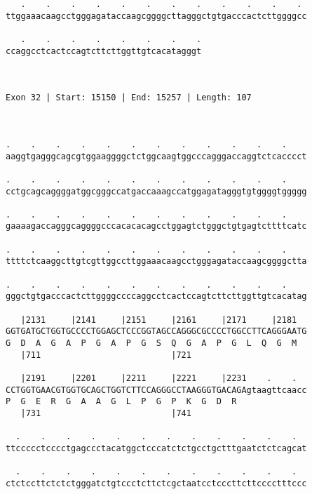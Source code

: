 \documentclass{article}
\begin{document}
\begin{Verbatim}
   .    .    .    .    .    .    .    .    .    .    .    . 
ttggaaacaagcctgggagataccaagcggggcttagggctgtgacccactcttggggcc
                                                            
   .    .    .    .    .    .    .    .
ccaggcctcactccagtcttcttggttgtcacatagggt
                                       
                                       
 
Exon 32 | Start: 15150 | End: 15257 | Length: 107



.    .    .    .    .    .    .    .    .    .    .    .    
aaggtgagggcagcgtggaaggggctctggcaagtggcccagggaccaggtctcacccct
                                                            
.    .    .    .    .    .    .    .    .    .    .    .    
cctgcagcaggggatggcgggccatgaccaaagccatggagatagggtgtggggtggggg
                                                            
.    .    .    .    .    .    .    .    .    .    .    .    
gaaaagaccagggcaggggcccacacacagcctggagtctgggctgtgagtcttttcatc
                                                            
.    .    .    .    .    .    .    .    .    .    .    .    
ttttctcaaggcttgtcgttggccttggaaacaagcctgggagataccaagcggggctta
                                                            
.    .    .    .    .    .    .    .    .    .    .    .    
gggctgtgacccactcttggggccccaggcctcactccagtcttcttggttgtcacatag
                                                            
   |2131     |2141     |2151     |2161     |2171     |2181  
GGTGATGCTGGTGCCCCTGGAGCTCCCGGTAGCCAGGGCGCCCCTGGCCTTCAGGGAATG
G  D  A  G  A  P  G  A  P  G  S  Q  G  A  P  G  L  Q  G  M  
   |711                          |721                       
  
   |2191     |2201     |2211     |2221     |2231    .    .  
CCTGGTGAACGTGGTGCAGCTGGTCTTCCAGGGCCTAAGGGTGACAGAgtaagttcaacc
P  G  E  R  G  A  A  G  L  P  G  P  K  G  D  R              
   |731                          |741                       
  
  .    .    .    .    .    .    .    .    .    .    .    .  
ttccccctcccctgagccctacatggctcccatctctgcctgctttgaatctctcagcat
                                                            
  .    .    .    .    .    .    .    .    .    .    .    .  
ctctccttctctctgggatctgtccctcttctcgctaatcctcccttcttcccctttccc
                                                            

\end{Verbatim}
\end{document}
